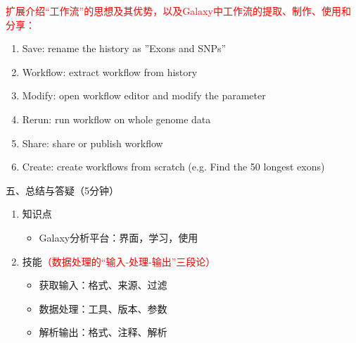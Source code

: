 \documentclass{TIJMUjiaoanLL}
\begin{document}
\textcolor{red}{扩展介绍“工作流”的思想及其优势，以及Galaxy中工作流的提取、制作、使用和分享：}
\begin{enumerate}
  \item Save: rename the history as ''Exons and SNPs''
  \item Workflow: extract workflow from history
  \item Modify: open workflow editor and modify the parameter
  \item Rerun: run workflow on whole genome data
  \item Share: share or publish workflow
  \item Create: create workflows from scratch (e.g. Find the 50 longest exons)
\end{enumerate}

\vspace*{0.2cm}
\noindent
五、总结与答疑（5分钟）
\begin{enumerate}
  \item 知识点
    \begin{itemize}
      \item Galaxy分析平台：界面，学习，使用
    \end{itemize}
  \item 技能\textcolor{red}{（数据处理的“输入-处理-输出”三段论）}
    \begin{itemize}
      \item 获取输入：格式、来源、过滤
      \item 数据处理：工具、版本、参数
      \item 解析输出：格式、注释、解析
    \end{itemize}
\end{enumerate}


\otherTail
\end{document}
